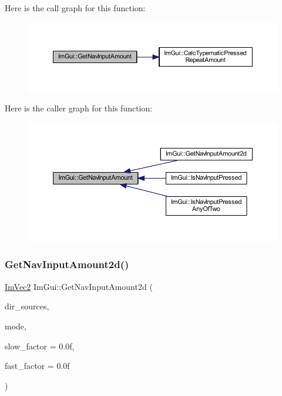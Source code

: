 Here is the call graph for this function\+:
\nopagebreak
\begin{figure}[H]
\begin{center}
\leavevmode
\includegraphics[width=350pt]{namespace_im_gui_a468ab885f9d3bd81cc7e8c3608c05193_cgraph}
\end{center}
\end{figure}
Here is the caller graph for this function\+:
\nopagebreak
\begin{figure}[H]
\begin{center}
\leavevmode
\includegraphics[width=350pt]{namespace_im_gui_a468ab885f9d3bd81cc7e8c3608c05193_icgraph}
\end{center}
\end{figure}
\mbox{\label{namespace_im_gui_a7b84c4630dad4ef5d07b366d36c39476}} 
\subsubsection{\texorpdfstring{Get\+Nav\+Input\+Amount2d()}{GetNavInputAmount2d()}}
{\footnotesize\ttfamily \mbox{\hyperlink{struct_im_vec2}{Im\+Vec2}} Im\+Gui\+::\+Get\+Nav\+Input\+Amount2d (\begin{DoxyParamCaption}\item[{\mbox{\hyperlink{imgui__internal_8h_a83858661b68556d7da82de40d020e152}{Im\+Gui\+Nav\+Dir\+Source\+Flags}}}]{dir\+\_\+sources,  }\item[{\mbox{\hyperlink{imgui__internal_8h_a595aad51728e2685daff714edb3d05fd}{Im\+Gui\+Input\+Read\+Mode}}}]{mode,  }\item[{float}]{slow\+\_\+factor = {\ttfamily 0.0f},  }\item[{float}]{fast\+\_\+factor = {\ttfamily 0.0f} }\end{DoxyParamCaption})}

